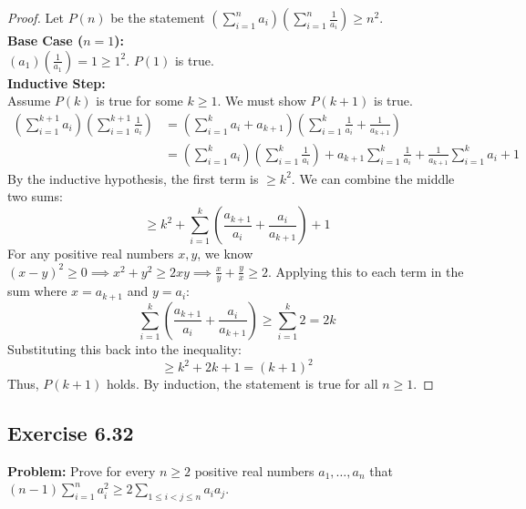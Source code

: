 \documentclass[11pt, a4paper]{article}
\theoremstyle{definition}
\theoremstyle{remark}
\begin{document}
\begin{proof}
Let $P(n)$ be the statement $\left(\sum_{i=1}^n a_i\right)\left(\sum_{i=1}^n \frac{1}{a_i}\right) \ge n^2$.
\vspace{4pt} \\
\textbf{Base Case ($n = 1$):} \\
$(a_1)\left(\frac{1}{a_1}\right) = 1 \ge 1^2$. $P(1)$ is true.
\vspace{4pt} \\
\textbf{Inductive Step:} \\
Assume $P(k)$ is true for some $k \ge 1$. We must show $P(k+1)$ is true.
\begin{align*}
\left(\sum_{i=1}^{k+1} a_i\right)\left(\sum_{i=1}^{k+1} \frac{1}{a_i}\right) &= \left(\sum_{i=1}^k a_i + a_{k+1}\right)\left(\sum_{i=1}^k \frac{1}{a_i} + \frac{1}{a_{k+1}}\right) \\
&= \left(\sum_{i=1}^k a_i\right)\left(\sum_{i=1}^k \frac{1}{a_i}\right) + a_{k+1}\sum_{i=1}^k \frac{1}{a_i} + \frac{1}{a_{k+1}}\sum_{i=1}^k a_i + 1
\end{align*}
By the inductive hypothesis, the first term is $\ge k^2$. We can combine the middle two sums:
\[ \ge k^2 + \sum_{i=1}^k \left( \frac{a_{k+1}}{a_i} + \frac{a_i}{a_{k+1}} \right) + 1 \]
For any positive real numbers $x, y$, we know $(x-y)^2 \ge 0 \implies x^2+y^2 \ge 2xy \implies \frac{x}{y} + \frac{y}{x} \ge 2$. 
Applying this to each term in the sum where $x = a_{k+1}$ and $y = a_i$:
\[ \sum_{i=1}^k \left( \frac{a_{k+1}}{a_i} + \frac{a_i}{a_{k+1}} \right) \ge \sum_{i=1}^k 2 = 2k \]
Substituting this back into the inequality:
\[ \ge k^2 + 2k + 1 = (k+1)^2 \]
Thus, $P(k+1)$ holds. By induction, the statement is true for all $n \ge 1$.
\end{proof}

\subsection{Exercise 6.32}
\textbf{Problem:} Prove for every $n \ge 2$ positive real numbers $a_1, \dots, a_n$ that $(n-1)\sum_{i=1}^n a_i^2 \ge 2 \sum_{1 \le i < j \le n} a_i a_j$.
\end{document}
